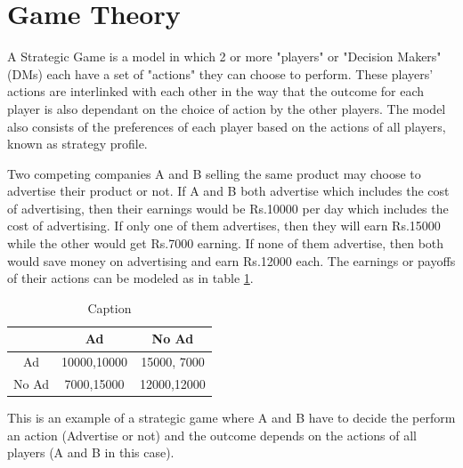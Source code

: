 

\section{Game Theory}
\begin{definition}
A Strategic Game is a model in which 2 or more "players" or "Decision Makers" (DMs) each have a set of "actions" they can choose to perform. These players' actions are interlinked with each other in the way that the outcome for each player is also dependant on the choice of action by the other players. The model also consists of the preferences of each player based on the actions of all players, known as strategy profile.
\end{definition}

\begin{example}
Two competing companies A and B selling the same product may choose to advertise their product or not. If A and B both advertise which includes the cost of advertising, then their earnings would be Rs.10000 per day which includes the cost of advertising. 
If only one of them advertises, then they will earn Rs.15000 while the other would get Rs.7000 earning.
If none of them advertise, then both would save money on advertising and earn Rs.12000 each. The earnings or payoffs of their actions can be modeled as in table \ref{tab:game1}.

\begin{table}[]
    \centering
    \begin{tabular}{c|c|c|}
         & Ad & No Ad \\
         \hline
        Ad & 10000,10000 & 15000, 7000 \\
        No Ad & 7000,15000 & 12000,12000
    \end{tabular}
    \caption{Caption}
    \label{tab:game1}
\end{table}

This is an example of a strategic game where A and B have to decide the perform an action (Advertise or not) and the outcome depends on the actions of all players (A and B in this case).

\end{example}

